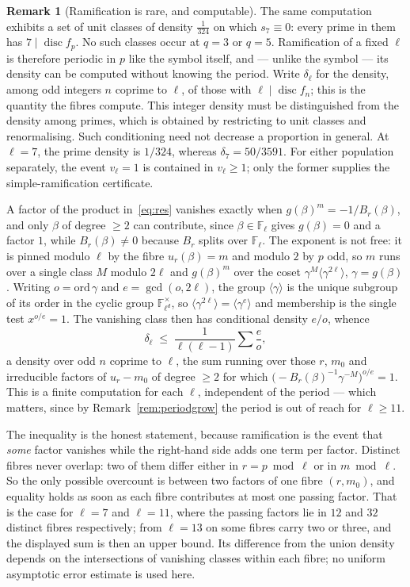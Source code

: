 \documentclass[11pt,a4paper]{amsart}
\newcommand{\F}{\mathbb{F}}
\newcommand{\disc}{\operatorname{disc}}
\theoremstyle{plain}
\theoremstyle{definition}
\newtheorem{remark}[theorem]{Remark}
\begin{document}
\begin{remark}[Ramification is rare, and computable]
\label{rem:s7zero}
The same computation exhibits a set of unit classes of density \(\tfrac1{324}\) on which \(s_7\equiv0\): every prime in them has \(7\mid\disc f_p\). No such classes occur at \(q=3\) or \(q=5\). Ramification of a fixed \(\ell\) is therefore periodic in \(p\) like the symbol itself, and --- unlike the symbol --- its density can be computed without knowing the period. Write \(\delta_\ell\) for the density, among odd integers \(n\) coprime to \(\ell\), of those with \(\ell\mid\disc f_n\); this is the quantity the fibres compute. This integer density must be distinguished from the density among primes, which is obtained by restricting to unit classes and renormalising. Such conditioning need not decrease a proportion in general. At \(\ell=7\), the prime density is \(1/324\), whereas \(\delta_7=50/3591\). For either population separately, the event \(v_\ell=1\) is contained in \(v_\ell\ge1\); only the former supplies the simple-ramification certificate.

A factor of the product in~\eqref{eq:res} vanishes exactly when \(g(\beta)^m=-1/B_r(\beta)\), and only \(\beta\) of degree \(\ge2\) can contribute, since \(\beta\in\F_\ell\) gives \(g(\beta)=0\) and a factor \(1\), while \(B_r(\beta)\ne0\) because \(B_r\) splits over \(\F_\ell\). The exponent is not free: it is pinned modulo \(\ell\) by the fibre \(u_r(\beta)=m\) and modulo \(2\) by \(p\) odd, so \(m\) runs over a single class \(M\) modulo \(2\ell\) and \(g(\beta)^m\) over the coset \(\gamma^M\langle\gamma^{2\ell}\rangle\), \(\gamma=g(\beta)\). Writing \(o=\mathrm{ord}\,\gamma\) and \(e=\gcd(o,2\ell)\), the group \(\langle\gamma\rangle\) is the unique subgroup of its order in the cyclic group \(\F_{\ell^d}^\times\), so \(\langle\gamma^{2\ell}\rangle=\langle\gamma^{e}\rangle\) and membership is the single test \(x^{o/e}=1\). The vanishing class then has conditional density \(e/o\), whence
\[
\delta_\ell\;\le\;\frac1{\ell(\ell-1)}\sum\frac{e}{o},
\]
a density over odd \(n\) coprime to \(\ell\), the sum running over those \(r\), \(m_0\) and irreducible factors of \(u_r-m_0\) of degree \(\ge2\) for which \(\bigl(-B_r(\beta)^{-1}\gamma^{-M}\bigr)^{o/e}=1\). This is a finite computation for each \(\ell\), independent of the period --- which matters, since by Remark~\ref{rem:periodgrow} the period is out of reach for \(\ell\ge11\).

The inequality is the honest statement, because ramification is the event that \emph{some} factor vanishes while the right-hand side adds one term per factor. Distinct fibres never overlap: two of them differ either in \(r=p\bmod\ell\) or in \(m\bmod\ell\). So the only possible overcount is between two factors of one fibre \((r,m_0)\), and equality holds as soon as each fibre contributes at most one passing factor. That is the case for \(\ell=7\) and \(\ell=11\), where the passing factors lie in \(12\) and \(32\) distinct fibres respectively; from \(\ell=13\) on some fibres carry two or three, and the displayed sum is then an upper bound. Its difference from the union density depends on the intersections of vanishing classes within each fibre; no uniform asymptotic error estimate is used here.


\end{remark}
\end{document}
